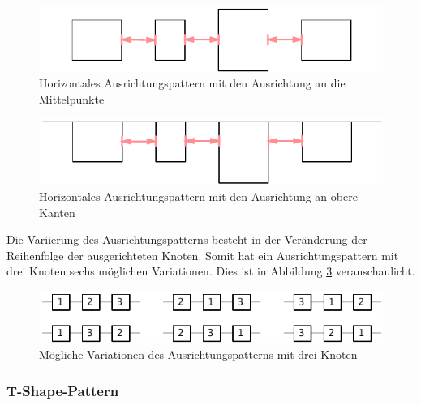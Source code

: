 \begin{figure}[hbt]
    \centering
    \includegraphics{resources/layout-pattern-alignment-center}
    \caption{Horizontales Ausrichtungspattern mit den Ausrichtung an die Mittelpunkte}
    \label{fig:layout-pattern-alignment-center}
\end{figure}

\begin{figure}[hbt]
    \centering
    \includegraphics{resources/layout-pattern-alignment-top}
    \caption{Horizontales Ausrichtungspattern mit den Ausrichtung an obere Kanten}
    \label{fig:layout-pattern-alignment-top}
\end{figure}

Die Variierung des Ausrichtungspatterns besteht in der Veränderung der Reihenfolge der ausgerichteten Knoten. Somit hat ein Ausrichtungspattern mit drei Knoten sechs möglichen Variationen. Dies ist in Abbildung \ref{fig:layout-pattern-alignment-variations} veranschaulicht.

\begin{figure}[hbt]
    \centering
    \includegraphics[scale=1.3]{resources/layout-pattern-alignment-variations}
    \caption{Mögliche Variationen des Ausrichtungspatterns mit drei Knoten}
    \label{fig:layout-pattern-alignment-variations}
\end{figure}

\subsubsection{T-Shape-Pattern}
\label{subsubsec:t-shape-pattern}

